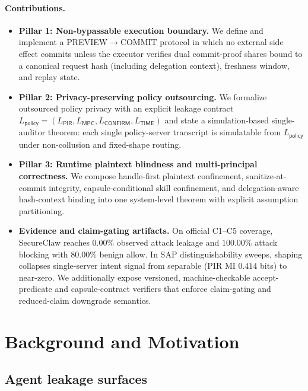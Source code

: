 \paragraph{Contributions.}
\begin{itemize}
  \item \textbf{Pillar 1: Non-bypassable execution boundary.}
  We define and implement a PREVIEW$\rightarrow$COMMIT protocol in which no external side effect commits unless the executor verifies dual commit-proof shares bound to a canonical request hash (including delegation context), freshness window, and replay state.

  \item \textbf{Pillar 2: Privacy-preserving policy outsourcing.}
  We formalize outsourced policy privacy with an explicit leakage contract $L_{\mathsf{policy}}=(L_{\mathsf{PIR}},L_{\mathsf{MPC}},L_{\mathsf{CONFIRM}},L_{\mathsf{TIME}})$ and state a simulation-based single-auditor theorem: each single policy-server transcript is simulatable from $L_{\mathsf{policy}}$ under non-collusion and fixed-shape routing.

  \item \textbf{Pillar 3: Runtime plaintext blindness and multi-principal correctness.}
  We compose handle-first plaintext confinement, sanitize-at-commit integrity, capsule-conditional skill confinement, and delegation-aware hash-context binding into one system-level theorem with explicit assumption partitioning.

  \item \textbf{Evidence and claim-gating artifacts.}
  On official C1--C5 coverage, SecureClaw reaches $0.00\%$ observed attack leakage and $100.00\%$ attack blocking with $80.00\%$ benign allow.
  In SAP distinguishability sweeps, shaping collapses single-server intent signal from separable (PIR MI $0.414$ bits) to near-zero.
  We additionally expose versioned, machine-checkable accept-predicate and capsule-contract verifiers that enforce claim-gating and reduced-claim downgrade semantics.
\end{itemize}

\section{Background and Motivation}
\label{sec:background}

\subsection{Agent leakage surfaces}

